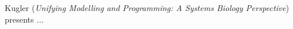 

Kugler
\cite{isola-2016-kugler}
({\em Unifying Modelling and Programming: A Systems Biology Perspective})
presents ...
